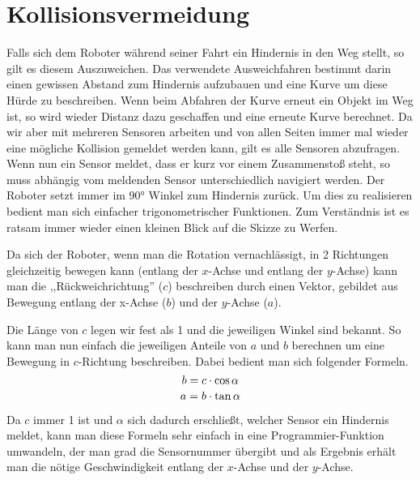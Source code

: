 \chapter{Kollisionsvermeidung}

Falls sich dem Roboter während seiner Fahrt ein Hindernis in den Weg stellt, so
gilt es diesem Auszuweichen. Das verwendete Ausweichfahren bestimmt darin einen
gewissen Abstand zum Hindernis aufzubauen und eine Kurve um diese Hürde zu
beschreiben. Wenn beim Abfahren der Kurve erneut ein Objekt im Weg ist, so wird
wieder Distanz dazu geschaffen und eine erneute Kurve berechnet. Da wir aber mit
mehreren Sensoren arbeiten und von allen Seiten immer mal wieder eine mögliche
Kollision gemeldet werden kann, gilt es alle Sensoren abzufragen. Wenn nun ein
Sensor meldet, dass er kurz vor einem Zusammenstoß steht, so muss abhängig vom
meldenden Sensor unterschiedlich navigiert werden. Der Roboter setzt immer im
90° Winkel zum Hindernis zurück. Um dies zu realisieren bedient man sich
einfacher trigonometrischer Funktionen. Zum Verständnis ist es ratsam immer
wieder einen kleinen Blick auf die Skizze zu Werfen.

Da sich der Roboter, wenn man die Rotation vernachlässigt, in 2 Richtungen
gleichzeitig bewegen kann (entlang der $x$-Achse und entlang der $y$-Achse) kann
man die ,,Rückweichrichtung'' ($c$) beschreiben durch einen Vektor, gebildet aus
Bewegung entlang der x-Achse ($b$) und der $y$-Achse ($a$).

Die Länge von $c$ legen wir fest als 1 und die jeweiligen Winkel sind bekannt.
So kann man nun einfach die jeweiligen Anteile von $a$ und $b$ berechnen um eine
Bewegung in $c$-Richtung beschreiben. Dabei bedient man sich folgender Formeln.
\[b = c \cdot \cos \alpha\]
\[a = b \cdot \tan \alpha\]

Da $c$ immer 1 ist und $\alpha$ sich dadurch erschließt, welcher Sensor ein
Hindernis meldet, kann man diese Formeln sehr einfach in eine
Programmier-Funktion umwandeln, der man grad die Sensornummer übergibt und als
Ergebnis erhält man die nötige Geschwindigkeit entlang der $x$-Achse und der
$y$-Achse.


